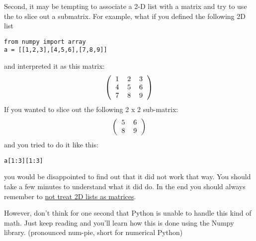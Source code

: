 Second, it may be tempting to associate a
2-D list with a matrix and try to use the \code{:} to slice out a
submatrix.  For example, what if you defined the following 2D list
\begin{Verbatim}
from numpy import array
a = [[1,2,3],[4,5,6],[7,8,9]]
\end{Verbatim}
and interpreted it as this matrix:
\begin{equation}
\left( \begin{tabular}{ccc}
1 & 2 & 3\\
4 & 5 & 6\\
7 & 8 & 9\\
\end{tabular}
\right)
\end{equation}
If you wanted to slice out the following 2 x 2 sub-matrix:
\begin{equation}
\left(\begin{tabular}{cc}
5 & 6 \\
8 & 9 \\
\end{tabular}
\right)
\end{equation}
and you tried to do it like this:
\begin{Verbatim}
a[1:3][1:3]
\end{Verbatim}
you would be disappointed to find out that it did not work that way.
You should take a few minutes to understand what it did do.  In the
end you should always remember to \ul{not treat 2D lists as matrices}.

However, don't think for one second that Python is unable
to handle this kind of math.  Just keep reading and you'll learn how
this is done using the Numpy library. (pronounced num-pie, short for numerical
Python)


